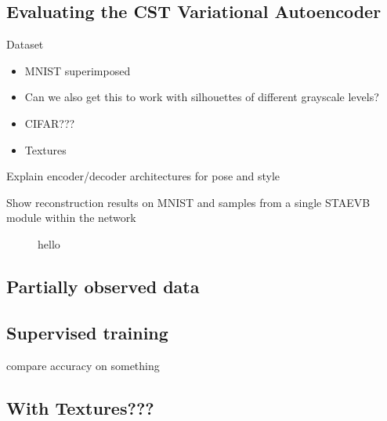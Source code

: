 \subsection{Evaluating the CST Variational Autoencoder}

Dataset
\begin{itemize}
\item MNIST superimposed
\item Can we also get this to work with silhouettes of different grayscale levels?
\item CIFAR???
\item Textures
\end{itemize}


Explain encoder/decoder architectures for pose and style

Show reconstruction results on MNIST and samples from a single STAEVB module within the network



\begin{figure}[t]
\begin{center}
\end{center}
 \caption{hello}
\end{figure}




\subsection{Partially observed data}




\subsection{Supervised training}

compare accuracy on something



\subsection{With Textures???}












